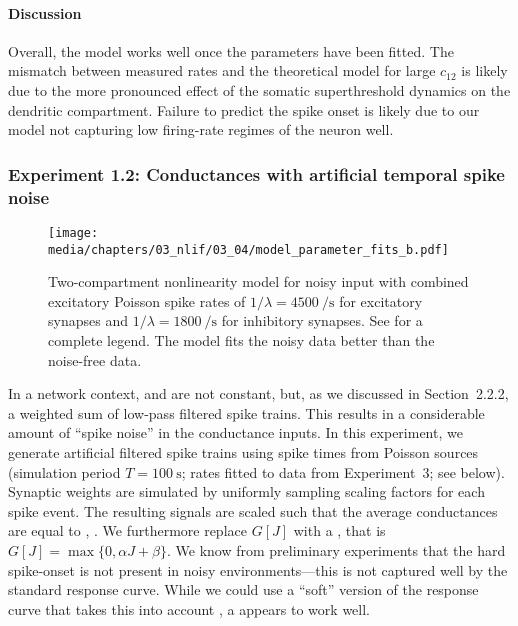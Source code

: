 \paragraph{Discussion}
Overall, the model works well once the parameters have been fitted.
The mismatch between measured rates and the theoretical model for large $c_{12}$ is likely due to the more pronounced effect of the somatic superthreshold dynamics on the dendritic compartment.
Failure to predict the spike onset is likely due to our model not capturing low firing-rate regimes of the neuron well.

\subsubsection{Experiment 1.2: Conductances with artificial temporal spike noise}

\begin{figure}[t]
	\texttt{[image: media/chapters/03\_nlif/03\_04/model\_parameter\_fits\_b.pdf]}%
	\caption[Two-compartment nonlinearity model for noisy input]{Two-compartment nonlinearity model for noisy input with combined excitatory Poisson spike rates of $1/\lambda = \SI{4500}{\per\second}$ for excitatory synapses and $1/\lambda = \SI{1800}{\per\second}$ for inhibitory synapses.
	See  for a complete legend.
	The model fits the noisy data better than the noise-free data.
	    }
	\label{fig:synaptic_nonlinearity_fit_b}%
\end{figure}

In a network context, \gE and \gI are not constant, but, as we discussed in Section~2.2.2, a weighted sum of low-pass filtered spike trains.
This results in a considerable amount of \enquote{spike noise} in the conductance inputs.
In this experiment, we generate artificial filtered spike trains using spike times from Poisson sources (simulation period $T = \SI{100}{\second}$; rates fitted to data from Experiment~3; see below).
Synaptic weights are simulated by uniformly sampling scaling factors for each spike event.
The resulting signals are scaled such that the average conductances are equal to \gE, \gI.
We furthermore replace $G[J]$ with a \ReLU, that is $G[J] = \max\{ 0, \alpha J + \beta \}$.
We know from preliminary experiments that the hard \LIF spike-onset is not present in noisy environments---this is not captured well by the standard \LIF response curve.
While we could use a \enquote{soft} version of the \LIF response curve that takes this into account \citep[cf.][]{capocelli1971diffusion,hunsberger2014competing,kreutz2015mean}, a \ReLU appears to work well.

